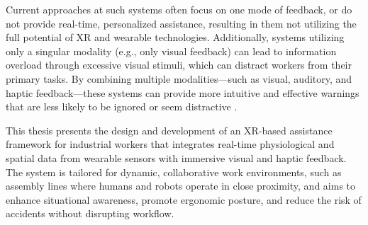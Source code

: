 Current approaches at such systems often focus on one mode of feedback, or do not
provide real-time, personalized assistance, resulting in them not utilizing the full potential
of XR and wearable technologies. Additionally, systems utilizing only a singular modality
(e.g., only visual feedback) can lead to information overload through excessive visual
stimuli, which can distract workers from their primary tasks. By combining multiple
modalities—such as visual, auditory, and haptic feedback—these systems can provide
more intuitive and effective warnings that are less likely to be ignored or seem distractive
\cite{lindeman2004haptic}.


This thesis presents the design and development of an XR-based assistance framework for industrial workers that integrates real-time physiological and spatial data from wearable sensors with immersive visual and haptic feedback. The system is tailored for dynamic, collaborative work environments, such as assembly lines where humans and robots operate in close proximity, and aims to enhance situational awareness, promote ergonomic posture, and reduce the risk of accidents without disrupting workflow.

